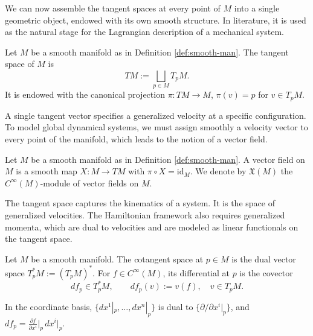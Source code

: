 We can now assemble the tangent spaces at every point of $M$ into a single geometric object, endowed with its own smooth structure. In literature, it is used as the natural stage for the Lagrangian description of a mechanical system.

\begin{definition}\label{def:tan-space}
	Let $M$ be a smooth manifold as in Definition \ref{def:smooth-man}. The tangent space of $M$ is
	\[
	TM := \bigsqcup_{p \in M} T_pM.
	\]
	It is endowed with the canonical projection $\pi: TM \to M$, $\pi(v) = p$ for $v \in T_pM$. 
	
\end{definition}

A single tangent vector specifies a generalized velocity at a specific configuration. To model global dynamical systems, we must assign smoothly a velocity vector to every point of the manifold, which leads to the notion of a vector field.

\begin{definition}\label{def:vector-field}
	Let $M$ be a smooth manifold as in Definition \ref{def:smooth-man}. A vector field on $M$ is a smooth map $X: M \to TM$ with $\pi \circ X = \mathrm{id}_M$. We denote by $\mathfrak{X}(M)$ the $C^\infty(M)$-module of vector fields on $M$.
\end{definition}

The tangent space captures the kinematics of a system. It is the space of generalized velocities. The Hamiltonian framework also requires generalized momenta, which are dual to velocities and are modeled as linear functionals on the tangent space.

\begin{definition}[Covector]\label{def:covector}
	Let $M$ be a smooth manifold. The cotangent space at $p \in M$ is the dual vector space $T_p^*M := (T_pM)^*$. For $f \in C^\infty(M)$, its differential at $p$ is the covector
	\[
	df_p \in T_p^*M, \qquad df_p(v) := v(f), \quad v \in T_pM.
	\]
\end{definition}

\begin{remark}\label{def:dual-basis}
	In the coordinate basis, $\{dx^1|_p,\dots,dx^n|_p\}$ is dual to $\{\partial/\partial x^i|_p\}$, and $df_p = \frac{\partial f}{\partial x^i}\Big|_p\, dx^i|_p$.
\end{remark}

